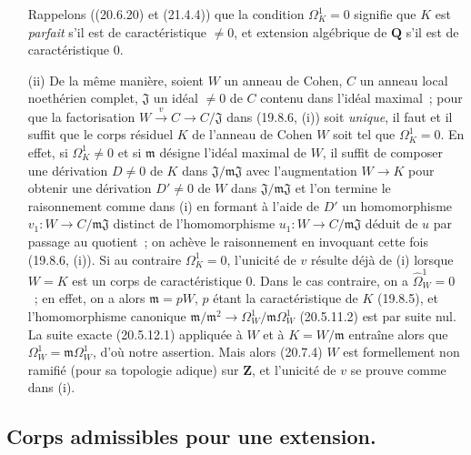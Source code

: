\begin{remarks}[21.5.3]
\begin{enumerate}
  Rappelons ((20.6.20) et (21.4.4)) que la condition $\Omega^1_K=0$ signifie
  que $K$ est \emph{parfait} s'il est de caractéristique $\ne0$, et extension
  algébrique de $\mathbf Q$ s'il est de caractéristique $0$.
  \item[(ii)] De la même manière, soient $W$ un anneau de Cohen, $C$ un anneau
  local noethérien complet, $\mathfrak J$ un idéal $\ne0$ de $C$ contenu dans
  l'idéal maximal~; pour que la factorisation $W\xrightarrow{v}C\to C/\mathfrak J$
  dans (19.8.6, (i)) soit \emph{unique}, il faut et il suffit que le corps résiduel
  $K$ de l'anneau de Cohen $W$ soit tel que $\Omega^1_K=0$. En effet, si
  $\Omega^1_K\ne0$ et si $\mathfrak m$ désigne l'idéal maximal de $W$, il
  suffit de composer une dérivation $D\ne0$ de $K$ dans
  $\mathfrak J/\mathfrak m\mathfrak J$ avec l'augmentation $W\to K$ pour
  obtenir une dérivation $D'\ne0$ de $W$ dans
  $\mathfrak J/\mathfrak m\mathfrak J$ et l'on termine le raisonnement comme
  dans (i) en formant à l'aide de $D'$ un homomorphisme
  $v_1:W\to C/\mathfrak m\mathfrak J$ distinct de l'homomorphisme
  $u_1:W\to C/\mathfrak m\mathfrak J$ déduit de $u$ par passage au quotient~;
  on achève le raisonnement en invoquant cette fois (19.8.6, (i)). Si au
  contraire $\Omega^1_K=0$, l'unicité de $v$ résulte déjà de (i) lorsque
  $W=K$ est un corps de caractéristique $0$. Dans le cas contraire, on a
  $\widehat{\Omega}^1_W=0$~; en effet, on a alors $\mathfrak m=pW$, $p$ étant
  la caractéristique de $K$ (19.8.5), et l'homomorphisme canonique
  $\mathfrak m/\mathfrak m^2\to\Omega^1_W/\mathfrak m\Omega^1_W$ (20.5.11.2)
  est par suite nul. La suite exacte (20.5.12.1) appliquée à $W$ et à
  $K=W/\mathfrak m$ entraîne alors que $\Omega^1_W=\mathfrak m\Omega^1_W$,
  d'où notre assertion. Mais alors (20.7.4) $W$ est formellement non ramifié
  (pour sa topologie adique) sur $\mathbf Z$, et l'unicité de $v$ se prouve
  comme dans (i).
\end{enumerate}
\end{remarks}

\subsection{Corps admissibles pour une extension.}
\label{section:0.21.6-fr}

